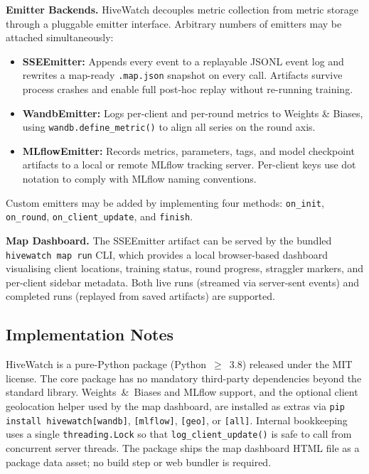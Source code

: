 \documentclass[preprint,12pt, a4paper]{elsarticle}
\begin{document}
\textbf{Emitter Backends.}
HiveWatch decouples metric collection from metric storage through a pluggable emitter interface. Arbitrary numbers of emitters may be attached simultaneously:

\begin{itemize}[noitemsep]
    \item \textbf{SSEEmitter:} Appends every event to a replayable JSONL event log and rewrites a map-ready \texttt{.map.json} snapshot on every call. Artifacts survive process crashes and enable full post-hoc replay without re-running training.
    \item \textbf{WandbEmitter:} Logs per-client and per-round metrics to Weights \& Biases, using \texttt{wandb.define\_metric()} to align all series on the round axis.
    \item \textbf{MLflowEmitter:} Records metrics, parameters, tags, and model checkpoint artifacts to a local or remote MLflow tracking server. Per-client keys use dot notation to comply with MLflow naming conventions.
\end{itemize}

Custom emitters may be added by implementing four methods: \texttt{on\_init}, \texttt{on\_round}, \texttt{on\_client\_update}, and \texttt{finish}.

\textbf{Map Dashboard.}
The SSEEmitter artifact can be served by the bundled \texttt{hivewatch map run} CLI, which provides a local browser-based dashboard visualising client locations, training status, round progress, straggler markers, and per-client sidebar metadata. Both live runs (streamed via server-sent events) and completed runs (replayed from saved artifacts) are supported.

\subsection{Implementation Notes}

HiveWatch is a pure-Python package (Python~$\geq$~3.8) released under the MIT license. The core package has no mandatory third-party dependencies beyond the standard library. Weights~\&~Biases and MLflow support, and the optional client geolocation helper used by the map dashboard, are installed as extras via \texttt{pip install hivewatch[wandb]}, \texttt{[mlflow]}, \texttt{[geo]}, or \texttt{[all]}. Internal bookkeeping uses a single \texttt{threading.Lock} so that \texttt{log\_client\_update()} is safe to call from concurrent server threads. The package ships the map dashboard HTML file as a package data asset; no build step or web bundler is required.
\end{document}
